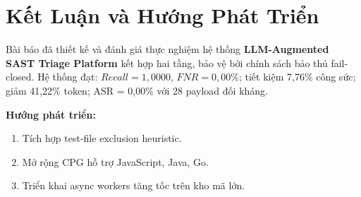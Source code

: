 \documentclass[12pt, a4paper]{article}
\begin{document}
\section{Kết Luận và Hướng Phát Triển}

Bài báo đã thiết kế và đánh giá thực nghiệm hệ thống
\textbf{LLM-Augmented SAST Triage Platform} kết hợp hai tầng, bảo vệ
bởi chính sách bảo thủ fail-closed. Hệ thống đạt:
$Recall = 1{,}0000$, $FNR = 0{,}00\%$; tiết kiệm 7,76\% công sức;
giảm 41,22\% token; ASR = 0,00\% với 28 payload đối kháng.

\noindent\textbf{Hướng phát triển:}
\begin{enumerate}
  \item Tích hợp test-file exclusion heuristic.
  \item Mở rộng CPG hỗ trợ JavaScript, Java, Go.
  \item Triển khai async workers tăng tốc trên kho mã lớn.
\end{enumerate}
\end{document}
